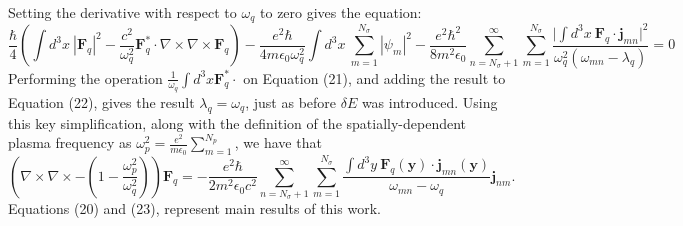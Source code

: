 \documentclass[aps,prb,onecolumn,
	groupedaddress,superscriptaddress,
	amsfonts,amssymb,amsmath,floatfix,
	citeautoscript]{revtex4-1}
\begin{document}
Setting the derivative with respect to $\omega_q$ to zero gives the equation:
\begin{equation}
\frac{\hbar}{4}\left(\int d^3x ~|\mathbf{F}_q|^2 - \frac{c^2}{\omega_q^2}\mathbf{F}^*_q\cdot\nabla\times\nabla\times\mathbf{F}_q \right) - \frac{e^2\hbar}{4m\epsilon_0\omega_q^2}\int d^3x~\sum\limits_{m=1}^{N_{\sigma}} |\psi_m|^2 -\frac{e^2\hbar^2}{8m^2\epsilon_0}\sum\limits_{n=N_{\sigma}+1}^{\infty}\sum\limits_{m=1}^{N_{\sigma}}\frac{\Big|\int d^3x~\mathbf{F}_q\cdot\mathbf{j}_{mn}\Big|^2}{\omega_q^2(\omega_{mn}-\lambda_q)}=  0 
\end{equation}
Performing the operation $\frac{1}{\omega_q}\int d^3x \mathbf{F}_q^* \cdot$ on Equation (21), and adding the result to Equation (22), gives the result $\lambda_q = \omega_q$, just as before $\delta E$ was introduced. Using this key simplification, along with the definition of the spatially-dependent plasma frequency as $\omega_p^2 = \frac{e^2}{m\epsilon_0}\sum\limits_{m=1}^{N_p}$, we have that
\begin{equation}
\left( \nabla\times\nabla\times - \left(1-\frac{\omega_p^2}{\omega_q^2} \right)\right)\mathbf{F}_q = -\frac{e^2\hbar}{2m^2\epsilon_0c^2}\sum\limits_{n=N_{\sigma}+1}^{\infty}\sum\limits_{m=1}^{N_{\sigma}} \frac{\int d^3y~\mathbf{F}_q(\mathbf{y})\cdot\mathbf{j}_{mn}(\mathbf{y})}{\omega_{mn}-\omega_{q}}\mathbf{j}_{nm}.
\end{equation}
Equations (20) and (23), represent main results of this work.



\end{document}
